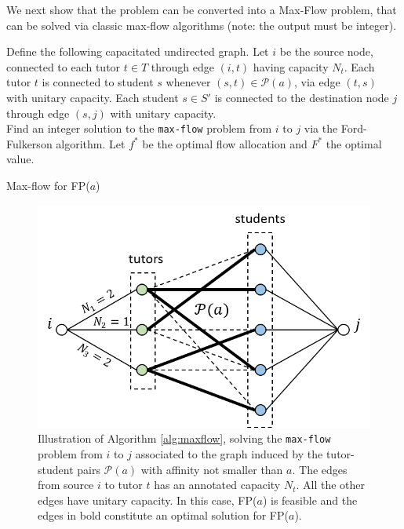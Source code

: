 \documentclass[11pt,oneside,a4paper]{article}     %
\begin{document}
We next show that the problem can be converted into a Max-Flow problem, that can be solved via classic max-flow algorithms (note: the output must be integer).

\begin{algorithm}[H]
Define the following capacitated undirected graph. Let $i$ be the source node, connected to each tutor $t\in T$ through edge $(i,t)$ having capacity $N_t$. Each tutor $t$ is connected to student $s$ whenever $(s,t)\in \mathcal P(a)$, via edge $(t,s)$ with unitary capacity. Each student $s\in S'$ is connected to the destination node $j$ through edge $(s,j)$ with unitary capacity.\\
Find an integer solution to the \texttt{max-flow} problem from $i$ to $j$ via the Ford-Fulkerson algorithm. Let $f^*$ be the optimal flow allocation and $F^*$ the optimal value.\\
\caption{Max-flow for FP($a$)}
\label{alg:maxflow}
\end{algorithm}


\begin{figure}
\centering
\includegraphics[scale=.75]{figs/maxflow.png}
\caption{Illustration of Algorithm \ref{alg:maxflow}, solving the \texttt{max-flow} problem from $i$ to $j$ associated to the graph induced by the tutor-student pairs $\mathcal P(a)$ with affinity not smaller than $a$. The edges from source $i$ to tutor $t$ has an annotated capacity $N_t$. All the other edges have unitary capacity. In this case, FP($a$) is feasible and the edges in bold constitute an optimal solution for FP($a$).}
\end{figure}
\end{document}
